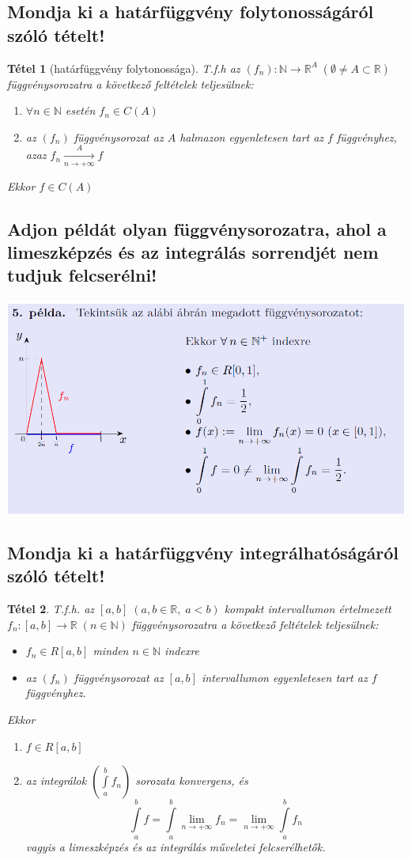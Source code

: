 \documentclass[12pt,a4paper]{article}
\newcommand{\R}{\mathbb{R}}
\newcommand{\N}{\mathbb{N}}
\newcommand{\fn}{f_n}
\newcommand{\bb}[1]{\left( #1 \right)}
\newcommand{\boxes}[1]{\left[ #1 \right]}
\newtheorem{tet}{Tétel}[section]
\begin{document}
\subsection{Mondja ki a határfüggvény folytonosságáról szóló tételt!}
\begin{tet}[határfüggvény folytonossága]
T.f.h az $\bb{\fn} : \N \to \R^A \; \bb{\emptyset \neq A \subset \R}$ függvénysorozatra a következő feltételek teljesülnek: 
\begin{enumerate}
\item $\forall n \in \N$ esetén $\fn \in C(A)$
\item az $\bb{\fn}$ függvénysorozat az $A$ halmazon egyenletesen tart az $f$ függvényhez, azaz $\fn \xrightarrow[n \to + \infty]{A} f$
\end{enumerate}
Ekkor $f \in C(A)$
\end{tet}
\subsection{Adjon példát olyan függvénysorozatra, ahol a limeszképzés és az integrálás sorrendjét nem tudjuk felcserélni!}
\includegraphics[width=\textwidth]{example1}
\subsection{Mondja ki a határfüggvény integrálhatóságáról szóló tételt!}
\begin{tet}
T.f.h. az $\boxes{a,b} \; \bb{a,b \in \R, \; a< b}$ kompakt intervallumon értelmezett $\fn:\boxes{a,b} \to \R \; \bb{n \in \N}$ függvénysorozatra a következő feltételek teljesülnek:
\begin{itemize}
\item $\fn \in R \boxes{a,b}$ minden $n \in \N$ indexre
\item az $\bb{\fn}$ függvénysorozat az $\boxes{a,b}$ intervallumon egyenletesen tart az $f$ függvényhez.
\end{itemize}
Ekkor 
\begin{enumerate}
\item $f\in R\boxes{a,b}$
\item az integrálok $\bb{\int\limits_a^b \fn} $ sorozata konvergens, és
\[
\int\limits_a^b f = \int\limits_a^b \lim\limits_{n \to +\infty} \fn  = \lim\limits_{n \to +\infty} \int\limits_a^b  \fn
\]
vagyis a limeszképzés és az integrálás műveletei felcserélhetők.
\end{enumerate}
\end{tet}
\end{document}
